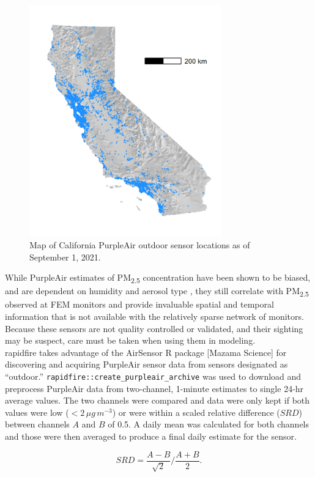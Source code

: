\documentclass[gmd, manuscript]{copernicus}
\begin{document}
\begin{figure}[h]
\includegraphics[width=8.3cm]{./Figures/SensorsGMD} \caption{Map of California PurpleAir outdoor sensor locations as of September 1, 2021.}\label{fig:sensors}
\end{figure}

While PurpleAir estimates of PM\textsubscript{2.5} concentration have
been shown to be biased, and are dependent on humidity and aerosol type
\citep{Barkjohn2021}, they still correlate with PM\textsubscript{2.5}
observed at FEM monitors and provide invaluable spatial and temporal
information that is not available with the relatively sparse network of
monitors. Because these sensors are not quality controlled or validated,
and their sighting may be suspect, care must be taken when using them in
modeling.\\
rapidfire takes advantage of the AirSensor R package {[}Mazama
Science{]} for discovering and acquiring PurpleAir sensor data from
sensors designated as ``outdoor.''
\texttt{rapidfire::create\_purpleair\_archive} was used to download and
preprocess PurpleAir data from two-channel, 1-minute estimates to single
24-hr average values. The two channels were compared and data were only
kept if both values were low (\(<2\,\unit{\mu g\,m^{-3}}\)) or were
within a scaled relative difference (\(SRD\)) between channels \(A\) and
\(B\) of 0.5. A daily mean was calculated for both channels and those
were then averaged to produce a final daily estimate for the sensor.

\begin{equation}
SRD=\frac{A-B}{\sqrt{2}}/\frac{A+B}{2}.  
\end{equation}
\end{document}
